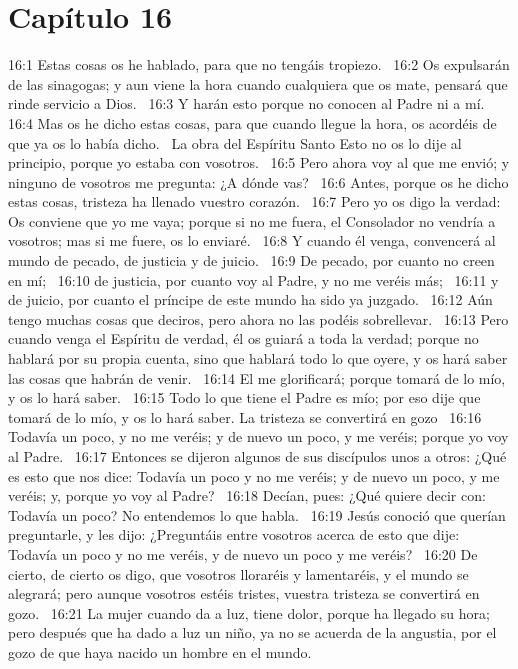 \section*{Capítulo 16}

16:1 Estas cosas os he hablado, para que no tengáis tropiezo.  
16:2 Os expulsarán de las sinagogas; y aun viene la hora cuando cualquiera que os mate, pensará que rinde servicio a Dios.  
16:3 Y harán esto porque no conocen al Padre ni a mí.  
16:4 Mas os he dicho estas cosas, para que cuando llegue la hora, os acordéis de que ya os lo había dicho.  
La obra del Espíritu Santo 
Esto no os lo dije al principio, porque yo estaba con vosotros.  
16:5 Pero ahora voy al que me envió; y ninguno de vosotros me pregunta: ¿A dónde vas?  
16:6 Antes, porque os he dicho estas cosas, tristeza ha llenado vuestro corazón.  
16:7 Pero yo os digo la verdad: Os conviene que yo me vaya; porque si no me fuera, el Consolador no vendría a vosotros; mas si me fuere, os lo enviaré.  
16:8 Y cuando él venga, convencerá al mundo de pecado, de justicia y de juicio.  
16:9 De pecado, por cuanto no creen en mí;  
16:10 de justicia, por cuanto voy al Padre, y no me veréis más;  
16:11 y de juicio, por cuanto el príncipe de este mundo ha sido ya juzgado.  
16:12 Aún tengo muchas cosas que deciros, pero ahora no las podéis sobrellevar.  
16:13 Pero cuando venga el Espíritu de verdad, él os guiará a toda la verdad; porque no hablará por su propia cuenta, sino que hablará todo lo que oyere, y os hará saber las cosas que habrán de venir.  
16:14 El me glorificará; porque tomará de lo mío, y os lo hará saber.  
16:15 Todo lo que tiene el Padre es mío; por eso dije que tomará de lo mío, y os lo hará saber. 
La tristeza se convertirá en gozo  
16:16 Todavía un poco, y no me veréis; y de nuevo un poco, y me veréis; porque yo voy al Padre.  
16:17 Entonces se dijeron algunos de sus discípulos unos a otros: ¿Qué es esto que nos dice: Todavía un poco y no me veréis; y de nuevo un poco, y me veréis; y, porque yo voy al Padre?  
16:18 Decían, pues: ¿Qué quiere decir con: Todavía un poco? No entendemos lo que habla.  
16:19 Jesús conoció que querían preguntarle, y les dijo: ¿Preguntáis entre vosotros acerca de esto que dije: Todavía un poco y no me veréis, y de nuevo un poco y me veréis?  
16:20 De cierto, de cierto os digo, que vosotros lloraréis y lamentaréis, y el mundo se alegrará; pero aunque vosotros estéis tristes, vuestra tristeza se convertirá en gozo.  
16:21 La mujer cuando da a luz, tiene dolor, porque ha llegado su hora; pero después que ha dado a luz un niño, ya no se acuerda de la angustia, por el gozo de que haya nacido un hombre en el mundo.  

